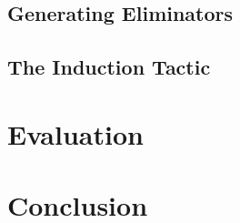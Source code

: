 \documentclass[a4paper]{article}%
\begin{document}
\subsection{Generating Eliminators}
\label{sub:GeneratingEliminators}

\subsection{The Induction Tactic}
\label{sub:TheInductionTactic}


\section{Evaluation}
\label{sec:Evaluation}
\section{Conclusion}
\label{sec:Conclusion}


\pagebreak
\appendix
\end{document}
